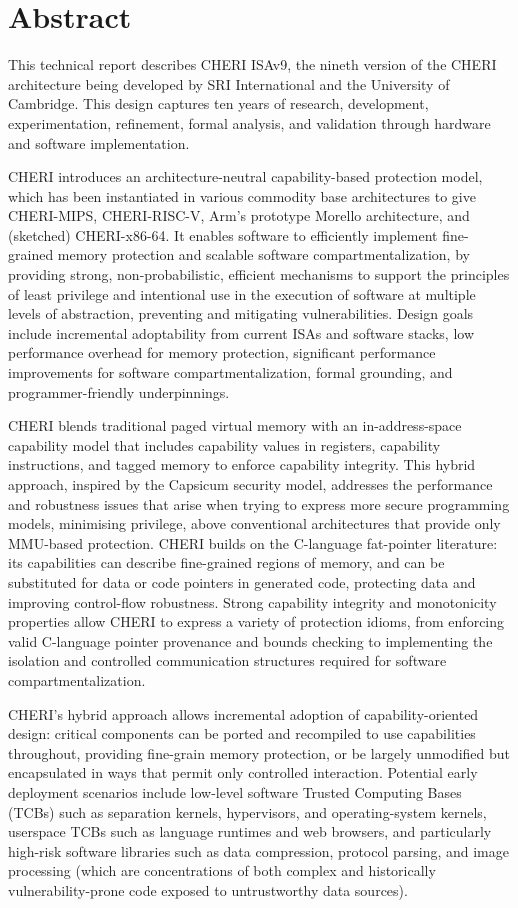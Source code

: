 \section*{Abstract}

This technical report describes CHERI ISAv9, the nineth version of the
CHERI architecture
being developed by SRI International and the University of Cambridge.
This design captures ten years of research, development, experimentation,
refinement, formal analysis, and validation through hardware and software
implementation.

CHERI introduces an architecture-neutral capability-based protection
model, which has been instantiated in various commodity base architectures
to give CHERI-MIPS,
CHERI-RISC-V, Arm's prototype Morello architecture, and (sketched)
CHERI-x86-64.
It enables software
to efficiently implement fine-grained memory protection and scalable software
compartmentalization, by providing strong, non-probabilistic, efficient
mechanisms to support the principles of least privilege and intentional use
in the execution of software at multiple levels of abstraction, preventing and
mitigating vulnerabilities.
Design goals include incremental adoptability from current ISAs and
software stacks, low performance overhead for memory protection, significant
performance improvements for software compartmentalization, formal grounding,
and programmer-friendly underpinnings.

CHERI blends traditional paged virtual memory with an
in-address-space capability model that includes capability values in registers,
capability instructions, and tagged memory to enforce capability integrity.
This hybrid approach, inspired by the Capsicum security model, addresses the performance and robustness issues that arise
when trying to express more secure programming models, minimising
privilege, above conventional architectures that provide only
MMU-based protection.
CHERI builds on the C-language fat-pointer literature: its capabilities can
describe fine-grained regions of memory, and can be substituted for data or
code pointers in generated code, protecting data and improving
control-flow robustness.
Strong capability integrity and monotonicity properties allow CHERI
to express a variety of protection idioms, from enforcing valid C-language
pointer provenance and bounds checking to implementing the isolation and
controlled communication structures required for software
compartmentalization.

CHERI's hybrid approach allows incremental adoption of capability-oriented design:
critical components can be ported and recompiled to use capabilities throughout,
providing fine-grain memory protection, or be largely unmodified but encapsulated in ways that permit
only controlled interaction. 
Potential early deployment scenarios include low-level software Trusted Computing
Bases (TCBs) such as separation kernels, hypervisors, and operating-system
kernels,  userspace TCBs such as language runtimes and web browsers, 
and particularly high-risk
software libraries such as data compression, protocol parsing, and image
processing (which are concentrations of both complex and historically
vulnerability-prone code exposed to untrustworthy data sources).

